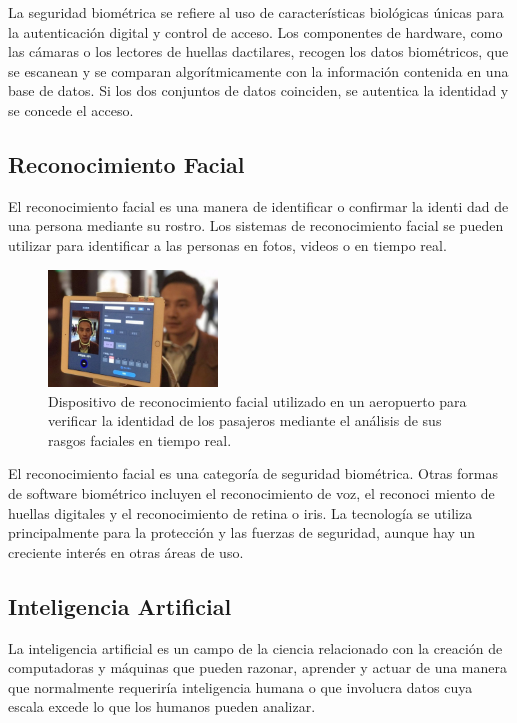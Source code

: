 \documentclass[10pt,a4paper]{article}
\begin{document}
\begin{multicols}{2}
La seguridad biométrica se refiere al uso de características biológicas únicas para la autenticación digital y control de acceso. Los componentes de
hardware, como las cámaras o los lectores de huellas dactilares, recogen los
datos biométricos, que se escanean y se comparan algorítmicamente con la
información contenida en una base de datos. Si los dos conjuntos de datos
coinciden, se autentica la identidad y se concede el acceso\cite{thalesBiometria}.

\subsection{Reconocimiento Facial}

El reconocimiento facial es una manera de identificar o confirmar la identi
dad de una persona mediante su rostro. Los sistemas de reconocimiento facial
se pueden utilizar para identificar a las personas en fotos, videos o en tiempo
real\cite{reconocimientoKaspersky}.

\begin{figure}[H]
  \centering
  \includegraphics[width=0.4\textwidth]{imagenes_doc/Reconocimiento_Facial.jpg}
  \caption{Dispositivo de reconocimiento facial utilizado en un aeropuerto para verificar la identidad de los pasajeros mediante el análisis de sus rasgos faciales en tiempo real\cite{aeropuertosJapon}.}
  \label{fig:logo}
\end{figure}

El reconocimiento facial es una categoría de seguridad biométrica. Otras
formas de software biométrico incluyen el reconocimiento de voz, el reconoci
miento de huellas digitales y el reconocimiento de retina o iris. La tecnología
se utiliza principalmente para la protección y las fuerzas de seguridad, aunque
hay un creciente interés en otras áreas de uso\cite{reconocimientoKaspersky}.

\subsection{Inteligencia Artificial}
La inteligencia artificial es un campo de la ciencia relacionado con la creación de computadoras y máquinas que pueden razonar, aprender y actuar de una manera que normalmente requeriría inteligencia humana o que involucra datos cuya escala excede lo que los humanos pueden analizar.


\end{multicols}
\end{document}
